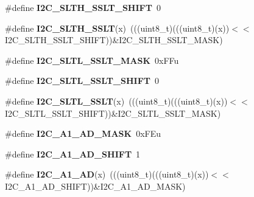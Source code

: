 \begin{DoxyCompactItemize}
\item 
\#define {\bfseries I2\+C\+\_\+\+S\+L\+T\+H\+\_\+\+S\+S\+L\+T\+\_\+\+S\+H\+I\+FT}~0\hypertarget{group__I2C__Register__Masks_gadc7429d429b6c58a18bcf147884e618f}{}\label{group__I2C__Register__Masks_gadc7429d429b6c58a18bcf147884e618f}

\item 
\#define {\bfseries I2\+C\+\_\+\+S\+L\+T\+H\+\_\+\+S\+S\+LT}(x)~(((uint8\+\_\+t)(((uint8\+\_\+t)(x))$<$$<$I2\+C\+\_\+\+S\+L\+T\+H\+\_\+\+S\+S\+L\+T\+\_\+\+S\+H\+I\+FT))\&I2\+C\+\_\+\+S\+L\+T\+H\+\_\+\+S\+S\+L\+T\+\_\+\+M\+A\+SK)\hypertarget{group__I2C__Register__Masks_gaf6d95ca3bdf2d8da490e7ff3c4a937b7}{}\label{group__I2C__Register__Masks_gaf6d95ca3bdf2d8da490e7ff3c4a937b7}

\item 
\#define {\bfseries I2\+C\+\_\+\+S\+L\+T\+L\+\_\+\+S\+S\+L\+T\+\_\+\+M\+A\+SK}~0x\+F\+Fu\hypertarget{group__I2C__Register__Masks_gac29118698aa1c246c26835a19210a0c9}{}\label{group__I2C__Register__Masks_gac29118698aa1c246c26835a19210a0c9}

\item 
\#define {\bfseries I2\+C\+\_\+\+S\+L\+T\+L\+\_\+\+S\+S\+L\+T\+\_\+\+S\+H\+I\+FT}~0\hypertarget{group__I2C__Register__Masks_ga177f38e09f29a382b35b19906462204f}{}\label{group__I2C__Register__Masks_ga177f38e09f29a382b35b19906462204f}

\item 
\#define {\bfseries I2\+C\+\_\+\+S\+L\+T\+L\+\_\+\+S\+S\+LT}(x)~(((uint8\+\_\+t)(((uint8\+\_\+t)(x))$<$$<$I2\+C\+\_\+\+S\+L\+T\+L\+\_\+\+S\+S\+L\+T\+\_\+\+S\+H\+I\+FT))\&I2\+C\+\_\+\+S\+L\+T\+L\+\_\+\+S\+S\+L\+T\+\_\+\+M\+A\+SK)\hypertarget{group__I2C__Register__Masks_gab7bec69c829adac299ed11bd66411507}{}\label{group__I2C__Register__Masks_gab7bec69c829adac299ed11bd66411507}

\item 
\#define {\bfseries I2\+C\+\_\+\+A1\+\_\+\+A\+D\+\_\+\+M\+A\+SK}~0x\+F\+Eu\hypertarget{group__I2C__Register__Masks_gad90fbd42f33b89ff3296c52700771b1b}{}\label{group__I2C__Register__Masks_gad90fbd42f33b89ff3296c52700771b1b}

\item 
\#define {\bfseries I2\+C\+\_\+\+A1\+\_\+\+A\+D\+\_\+\+S\+H\+I\+FT}~1\hypertarget{group__I2C__Register__Masks_gaf074658893634b95a9858ee29bbdd88a}{}\label{group__I2C__Register__Masks_gaf074658893634b95a9858ee29bbdd88a}

\item 
\#define {\bfseries I2\+C\+\_\+\+A1\+\_\+\+AD}(x)~(((uint8\+\_\+t)(((uint8\+\_\+t)(x))$<$$<$I2\+C\+\_\+\+A1\+\_\+\+A\+D\+\_\+\+S\+H\+I\+FT))\&I2\+C\+\_\+\+A1\+\_\+\+A\+D\+\_\+\+M\+A\+SK)\hypertarget{group__I2C__Register__Masks_ga5248771248d1964b566ca3de1cadf6a3}{}\label{group__I2C__Register__Masks_ga5248771248d1964b566ca3de1cadf6a3}


\end{DoxyCompactItemize}
